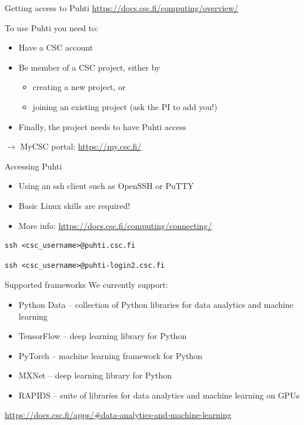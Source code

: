 \documentclass[aspectratio=1610,14pt]{beamer}
\newcommand{\link}[1]{\alert{\url{#1}}}
\begin{document}
\begin{frame}{Getting access to Puhti}
  \link{https://docs.csc.fi/computing/overview/}

  \vspace{1em}

  To use Puhti you need to:
  \begin{itemize}
  \item Have a CSC account
  \item Be member of a CSC project, either by
    \begin{itemize}
    \item creating a new project, or
    \item joining an existing project (ask the PI to add you!)
    \end{itemize}
  \item Finally, the project needs to have Puhti access
  \end{itemize}

  \vspace{1em}

  $\rightarrow$ \quad MyCSC portal: \link{https://my.csc.fi/}

\end{frame}

\begin{frame}[fragile]{Accessing Puhti}
  \begin{itemize}
  \item Using an ssh client such as OpenSSH or PuTTY
  \item Basic Linux skills are required!
  \item More info: \link{https://docs.csc.fi/computing/connecting/}
  \end{itemize}

  \vspace{1em}

\begin{verbatim}
ssh <csc_username>@puhti.csc.fi
\end{verbatim}

\begin{verbatim}
ssh <csc_username>@puhti-login2.csc.fi
\end{verbatim}

\end{frame}

\begin{frame}{Supported frameworks}
  We currently support:
  \begin{itemize}
  \item \alert{Python Data} -- collection of Python libraries for data
    analytics and machine learning
  \item \alert{TensorFlow} -- deep learning library for Python
  \item \alert{PyTorch} -- machine learning framework for Python
  \item \alert{MXNet} -- deep learning library for Python
  \item \alert{RAPIDS} -- suite of libraries for data analytics and
    machine learning on GPUs
  \end{itemize}

  {\small \link{https://docs.csc.fi/apps/\#data-analytics-and-machine-learning}}
\end{frame}
\end{document}
